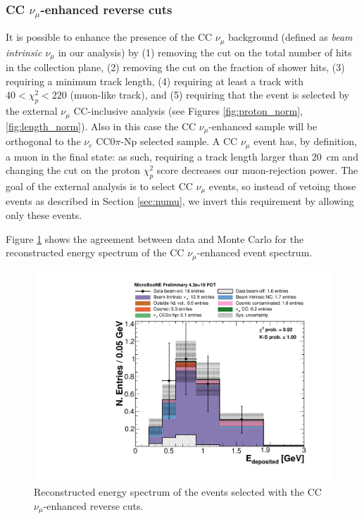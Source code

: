 \subsubsection{CC \texorpdfstring{$\nu_{\mu}$}{numu}-enhanced reverse cuts}
It is possible to enhance the presence of the CC $\nu_{\mu}$ background (defined as \emph{beam intrinsic $\nu_{\mu}$} in our analysis) by (1) removing the cut on the total number of hits in the collection plane, (2) removing the cut on the fraction of shower hits, (3) requiring a minimum track length, (4) requiring at least a track with $40 < \chi_p^{2} < 220$ (muon-like track), and (5) requiring that the event is selected by the external $\nu_{\mu}$ CC-inclusive analysis \cite{ubxsec} (see Figures \ref{fig:proton_norm}, \ref{fig:length_norm}). Also in this case the CC $\nu_{\mu}$-enhanced sample will be orthogonal to the $\nu_{e}$ CC0$\pi$-Np selected sample.
A CC $\nu_{\mu}$ event has, by definition, a muon in the final state: as such, requiring a track length larger than 20~cm and changing the cut on the proton $\chi^2_p$ score decreases our muon-rejection power. The goal of the external analysis is to select CC $\nu_{\mu}$ events, so instead of vetoing those events as described in Section \ref{sec:numu}, we invert this requirement by allowing only these events.

Figure \ref{fig:numu_inverted} shows the agreement between data and Monte Carlo for the reconstructed energy spectrum of the CC $\nu_{\mu}$-enhanced event spectrum.

\begin{figure}[htbp]
\centering
  \includegraphics[width=0.7\linewidth]{figures/numu_reco.pdf}
  \caption{Reconstructed energy spectrum of the events selected with the CC $\nu_{\mu}$-enhanced reverse cuts.}\label{fig:numu_inverted}
\end{figure}


